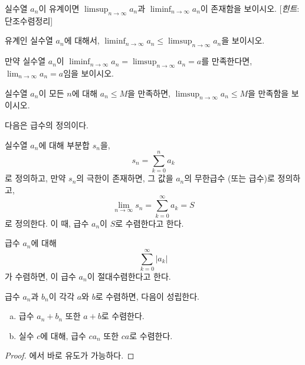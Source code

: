 \begin{exercise}
    실수열 $a_n$이 유계이면 $\limsup_{n \to \infty} a_n$과 $\liminf_{n \to \infty} a_n$이 존재함을 보이시오. [\textit{힌트}: 단조수렴정리]
\end{exercise}
\begin{exercise}
    유계인 실수열 $a_n$에 대해서, $\liminf_{n \to \infty} a_n \leq \limsup_{n \to \infty} a_n$을 보이시오.
\end{exercise}
\begin{exercise}
    만약 실수열 $a_n$이 $\liminf_{n \to \infty} a_n = \limsup_{n \to \infty} a_n = a$를 만족한다면, $\lim_{n \to \infty} a_n = a$임을 보이시오.
\end{exercise}
\begin{exercise}
    실수열 $a_n$이 모든 $n$에 대해 $a_n \leq M$을 만족하면, $\limsup_{n \to \infty} a_n \leq M$을 만족함을 보이시오.
\end{exercise}

다음은 급수의 정의이다.
\begin{definition}
 
 
    실수열 $a_n$에 대해 부분합 $s_n$을,
    \begin{equation*}
        s_n = \sum_{k = 0}^n a_k 
    \end{equation*}
    로 정의하고, 만약 $s_n$의 극한이 존재하면, 그 값을 $a_n$의 무한급수 (또는 급수)로 정의하고,
    \begin{equation*}
        \lim_{n \to \infty} s_n = \sum_{k = 0}^\infty a_k = S
    \end{equation*}
    로 정의한다.
    이 때, 급수 $a_n$이 $S$로 수렴한다고 한다.
\end{definition}

\begin{definition}
 
 
    급수 $a_n$에 대해
    \begin{equation*}
        \sum_{k = 0}^\infty |a_k|
    \end{equation*}
    가 수렴하면, 이 급수 $a_n$이 절대수렴한다고 한다.
\end{definition}

\begin{theorem}
\label{thm:algseries}
    급수 $a_n$과 $b_n$이 각각 $a$와 $b$로 수렴하면, 다음이 성립한다.
    \begin{enumerate}[(a)]
        \item 급수 $a_n + b_n$ 또한 $a + b$로 수렴한다.
        \item 실수 $c$에 대해, 급수 $c a_n$ 또한 $ca$로 수렴한다.
    \end{enumerate}
\end{theorem}
\begin{proof}
    에서 바로 유도가 가능하다.
\end{proof}

